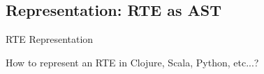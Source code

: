 \subsection{Representation: RTE as AST}


{  
\begin{frame}{ RTE Representation}

  How to represent an RTE in Clojure, Scala, Python, etc...?


  \medskip
  
\end{frame}
}

\newsavebox\exnoteboxscala
\begin{lrbox}{\exnoteboxscala}
  \begin{minipage}{6.5cm}
    
  \end{minipage}
\end{lrbox}

\newsavebox\exnoteboxclojure
\begin{lrbox}{\exnoteboxclojure}
  \begin{minipage}{6.5cm}
    
  \end{minipage}
\end{lrbox}

\newsavebox\exnoteboxpython
\begin{lrbox}{\exnoteboxpython}
  \begin{minipage}{6.5cm}
    
  \end{minipage}
\end{lrbox}



